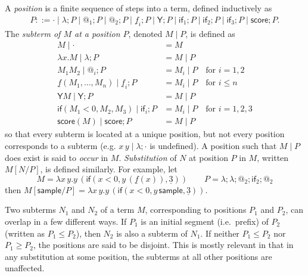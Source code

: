 \documentclass{article}
\newcommand{\tY}{\mathsf{Y}}
\newcommand{\tif}[3]{\mathsf{if}(#1, #2, #3)} %
\newcommand{\tsample}{\mathsf{sample}}
\newcommand{\tscore}{\mathsf{score}}
\theoremstyle{definition}
\theoremstyle{lemma}
\theoremstyle{remark}
\begin{document}
A \emph{position} 
is a finite sequence of steps into a term, defined inductively as
\begin{align*}
P ::= \cdot \mid \lambda ; P \mid @_1 ; P \mid @_2 ; P \mid \underline f_i ; P \mid \tY ; P \mid \textsf{if}_1 ; P \mid \textsf{if}_2 ; P \mid \textsf{if}_3 ; P \mid \tscore ; P.
\end{align*}
The \emph{subterm of $M$ at a position $P$}, denoted $M \mid P$, is defined as
\begin{align*}
M \mid \cdot & = M \\
\lambda x. M \mid \lambda ; P & = M \mid P \\
M_1 M_2 \mid @_i ; P & = M_i \mid P \quad \text{for } i = 1,2 \\
\underline f(M_1,\dots,M_n) \mid \underline f_i ; P & = M_i \mid P \quad \text{for }i \leq n \\
\tY M \mid \tY ; P & = M \mid P \\
\tif{M_1 < 0}{M_2}{M_3} \mid \textsf{if}_i ; P & = M_i \mid P \quad \text{for } i = 1,2,3 \\
\tscore(M) \mid \tscore ; P & = M \mid P
\end{align*}
so that every subterm is located at a unique position, but not every position corresponds to a subterm (e.g. $x \, y \mid \lambda ; \cdot$ is undefined). 
A position such that $M\mid P$ does exist is said to \emph{occur} in $M$. 
\emph{Substitution} of $N$ at position $P$ in $M$, written $M[N/P]$, is defined similarly.
For example, let 
\[
M = \lambda x \, y. y \, (\tif{x < 0}{y \, (\underline f (x))}{\underline 3})
\qquad
P =\lambda ; \lambda ; @_2 ; \textsf{if}_2 ; @_2
\]
then 
\(
M[\tsample / P] = \lambda x \, y. y \, (\tif{x < 0}{y \, \tsample}{\underline 3}).
\)

Two subterms $N_1$ and $N_2$ of a term $M$, corresponding to positions $P_1$ and $P_2$, can overlap in a few different ways. 
If $P_1$ is an initial segment (i.e.~prefix) of $P_2$ (written as $P_1 \leq P_2$), then $N_2$ is also a subterm of $N_1$. If neither $P_1 \leq P_2$ nor $P_1 \geq P_2$, the positions are said to be disjoint. 
This is mostly relevant in that in any substitution at some position, the subterms at all other positions are unaffected. 
\end{document}
